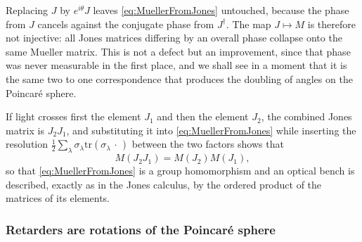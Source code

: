             Replacing $J$ by $e^{i\theta}J$ leaves \ref{eq:MuellerFromJones} untouched, because the phase from $J$ cancels against the conjugate phase from $J^{\dagger}$. The map $J\mapsto M$ is therefore not injective: all Jones matrices differing by an overall phase collapse onto the same Mueller matrix. This is not a defect but an improvement, since that phase was never measurable in the first place, and we shall see in a moment that it is the same two to one correspondence that produces the doubling of angles on the Poincaré sphere.

            If light crosses first the element $J_1$ and then the element $J_2$, the combined Jones matrix is $J_2J_1$, and substituting it into \ref{eq:MuellerFromJones} while inserting the resolution $\tfrac12\sum_\lambda\sigma_\lambda\text{tr}(\sigma_\lambda\,\cdot\,)$ between the two factors shows that
            \begin{equation}\label{eq:MuellerComposition}
                M\left(J_2J_1\right) = M\left(J_2\right)M\left(J_1\right) ,
            \end{equation}
            so that \ref{eq:MuellerFromJones} is a group homomorphism and an optical bench is described, exactly as in the Jones calculus, by the ordered product of the matrices of its elements.

        \subsubsection{Retarders are rotations of the Poincaré sphere}

